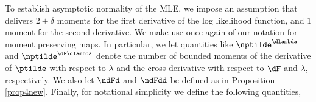 %    
%    
%    
%    
%
% 
%
%
%
%

To establish asymptotic normality of the MLE, we impose an assumption that delivers $2+\delta$ moments for the first derivative of the log likelihood function, and $1$ moment for the second derivative. We make use once again of our notation for moment preserving maps. In particular, we let quantities like $\nptilde^{\dlambda}$ and $\nptilde^{\dF \dlambda}$ 
denote the number of bounded moments of the derivative of $\ptilde$ with respect to $\lambda$ and 
the cross derivative with respect to $\dF$ and $\lambda$, respectively. We also let
$\ndFd$ and $\ndFdd$ be defined as in Proposition \ref{prop4new}. Finally, for notational simplicity we define the following quantities, 

